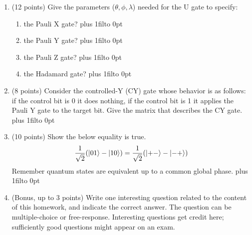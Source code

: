 \documentclass[12pt]{article}
\def\DefaultSpace{1in}
\newcommand{\LeaveSpace}[1][\DefaultSpace]{%
\vskip #1 plus 1fil\relax\hbox to 0pt{\hss} %
}
\begin{document}
\begin{enumerate}[font=\bfseries]
\begin{enumerate}
            \item $\ket{10}$ \LeaveSpace[0.3in]
            \item $\ket{0+}$ \LeaveSpace[0.3in]
            \item $\ket{+-}$ \LeaveSpace[0.3in]
        \end{enumerate}
    \item (12 points) Give the parameters ($\theta,\phi,\lambda$) needed for the U gate to specify:
        \begin{enumerate}
            \item the Pauli X gate? \LeaveSpace[0.3in]
            \item the Pauli Y gate? \LeaveSpace[0.3in]
            \item the Pauli Z gate? \LeaveSpace[0.3in]
            \item the Hadamard gate? \LeaveSpace[0.3in]
        \end{enumerate}
    \item (8 points) Consider the controlled-Y (CY) gate whose behavior is as follows: if the control bit is 0 it does nothing, if the control bit is 1 it applies the Pauli Y gate to the target bit. Give the matrix that describes the CY gate.  \LeaveSpace[2.5in]
    \item (10 points) Show the below equality is true.
    \[\frac{1}{\sqrt{2}}(\ket{01} - \ket{10}) = \frac{1}{\sqrt{2}}(\ket{+-} - \ket{-+})\]
    Remember quantum states are equivalent up to a common global phase. \LeaveSpace[2.0in]
    \item (Bonus, up to 3 points) Write one interesting question related to the content of this homework, and indicate the correct answer. The question can be multiple-choice or free-response.  Interesting questions get credit here;  sufficiently good questions might appear on an exam.
\end{enumerate}
\end{document}

